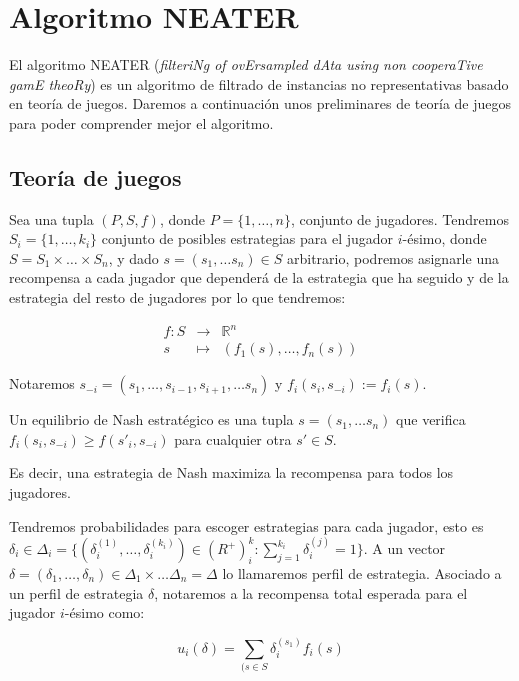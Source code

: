 \section{Algoritmo NEATER}
El algoritmo NEATER (\textit{filteriNg of ovErsampled dAta using non cooperaTive gamE theoRy}) es un algoritmo de filtrado 
de instancias no representativas basado en teoría de juegos. Daremos a continuación unos preliminares de teoría de juegos
para poder comprender mejor el algoritmo.

\subsection{Teoría de juegos}
Sea una tupla $(P, S, f)$, donde $P=\{1, \ldots, n\}$, conjunto de jugadores. Tendremos $S_i=\{1, \ldots, k_i\}$ conjunto
de posibles estrategias para el jugador $i$-ésimo, donde $S = S_1 \times \ldots \times S_n$, y dado $s = (s_1, \ldots s_n) \in S$
arbitrario, podremos asignarle una recompensa a cada jugador que dependerá de la estrategia que ha seguido y de la estrategia del
resto de jugadores por lo que tendremos:

\[\begin{array}{rll}
   f: S &\longrightarrow& \mathbb{R}^n\\
   s &\longmapsto& (f_1(s), \ldots, f_n(s))
  \end{array}\]
  
Notaremos $s_{-i} = (s_1, \ldots, s_{i-1}, s_{i+1}, \ldots s_n)$ y $f_i(s_i, s_{-i}):= f_i(s)$.

\begin{definition}
Un equilibrio de Nash estratégico es una tupla $s = (s_1, \ldots s_n)$ que verifica $f_i(s_i, s_{-i}) \ge f(s'_{i}, s_{-i})$ 
para cualquier otra $s'\in S$.
\end{definition}

Es decir, una estrategia de Nash maximiza la recompensa para todos los jugadores.

Tendremos probabilidades para escoger estrategias para cada jugador, esto es 
$\delta_i \in \Delta_i = \{(\delta_i^{(1)}, \ldots, \delta_i^{(k_i)}) \in (R^{+})^k_i : \sum_{j=1}^{k_i} \delta_i^{(j)} = 1\}$. 
A un vector $\delta = (\delta_1, \ldots, \delta_n) \in \Delta_1 \times \ldots \Delta_n = \Delta$ lo llamaremos perfil de estrategia. 
Asociado a un perfil de estrategia $\delta$, notaremos a la recompensa total esperada para el jugador $i$-ésimo como:

\[u_i(\delta) = \sum_{(s\in S} \delta_i^{(s_1)} f_i(s)\]

